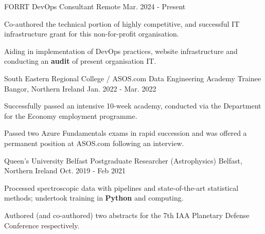 \begin{cventries}
  \cventry
  	{FORRT} %
    {DevOps Consultant} %
    {Remote} %
    {Mar. 2024 - Present} %
    {
    \begin{cvitems}
		\item {Co-authored the technical portion of highly competitive, and successful IT infrastructure grant for this non-for-profit organisation.}
		\item {Aiding in implementation of DevOps practices, website infrastructure and conducting an \textbf{audit} of present organisation IT.}
     \end{cvitems}
    }

  \cventry
  	{South Eastern Regional College / ASOS.com} %
    {Data Engineering Academy Trainee} %
    {Bangor, Northern Ireland} %
    {Jan. 2022 - Mar. 2022} %
    {
      \begin{cvitems} %
        \item {Successfully passed an intensive 10-week academy, conducted via the Department for the Economy employment programme.}
        \item {Passed two Azure Fundamentals exams in rapid succession and was offered a permanent position at ASOS.com following an interview.}
      \end{cvitems}
    }

  \cventry
    {Queen's University Belfast} %
    {Postgraduate Researcher (Astrophysics)} %
    {Belfast, Northern Ireland} %
    {Oct. 2019 - Feb 2021} %
    {
      \begin{cvitems} %
        \item {Processed spectroscopic data with pipelines and state-of-the-art statistical methods; undertook training in \textbf{Python} and computing.}
        \item {Authored (and co-authored) two abstracts for the 7th IAA Planetary Defense Conference respectively.}
      \end{cvitems}
    }
    

\end{cventries}
